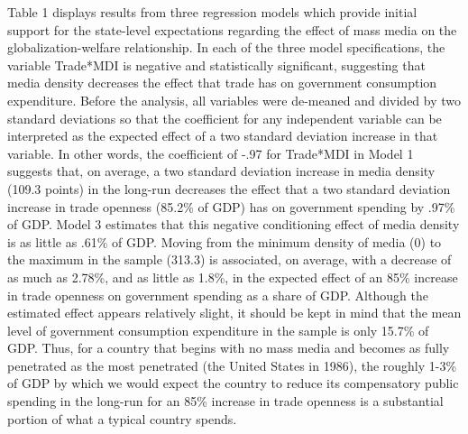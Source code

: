 \documentclass[12pt]{report}
\begin{document}
Table 1 displays results from three regression models which provide initial support for
the state-level expectations regarding the effect of mass media on the globalization-welfare
relationship. In each of the three model specifications, the variable Trade{*}MDI is negative and
statistically significant, suggesting that media density decreases the effect that trade has on
government consumption expenditure. Before the analysis, all variables were de-meaned and divided by
two standard deviations so that the coefficient for any independent variable can be interpreted as
the expected effect of a two standard deviation increase in that variable. In other words, the
coefficient of -.97 for Trade{*}MDI in Model 1 suggests that, on average, a two standard deviation
increase in media density (109.3 points) in the long-run decreases the effect that a two standard
deviation increase in trade openness (85.2\% of GDP) has on government spending by .97\% of GDP.
Model 3 estimates that this negative conditioning effect of media density is as little as .61\% of
GDP. Moving from the minimum density of media (0) to the maximum in the sample (313.3) is
associated, on average, with a decrease of as much as 2.78\%, and as little as 1.8\%, in the
expected effect of an 85\% increase in trade openness on government spending as a share of GDP.
Although the estimated effect appears relatively slight, it should be kept in mind that the mean
level of government consumption expenditure in the sample is only 15.7\% of GDP. Thus, for a country
that begins with no mass media and becomes as fully penetrated as the most penetrated (the United
States in 1986), the roughly 1-3\% of GDP by which we would expect the country to reduce its
compensatory public spending in the long-run for an 85\% increase in trade openness is a substantial
portion of what a typical country spends.
\end{document}
